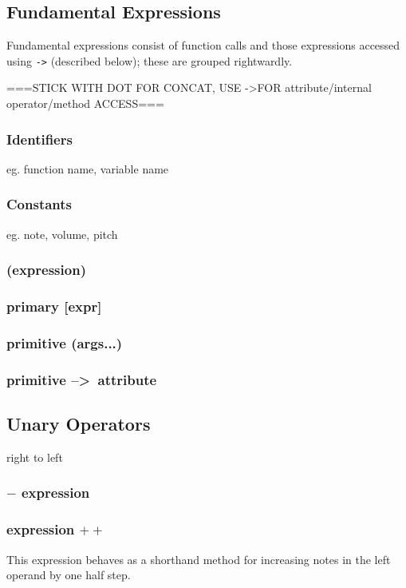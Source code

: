 \documentclass[letterpaper]{article}
\begin{document}
\subsection{Fundamental Expressions}
Fundamental expressions consist of function calls and those expressions accessed using \texttt{-\textgreater} (described below); these are grouped rightwardly.


===STICK WITH DOT FOR CONCAT, USE -\textgreater FOR attribute/internal operator/method ACCESS===

\subsubsection{Identifiers} 
eg. function name, variable name

\subsubsection{Constants}
eg. note, volume, pitch

\subsubsection{(expression)}
\subsubsection{primary [expr]}
\subsubsection{primitive (args...)}
\subsubsection{primitive --\textgreater\ attribute}

\subsection{Unary Operators}
right to left
\subsubsection{$-$ expression}
\subsubsection{expression $++$}
This expression behaves as a shorthand method for increasing notes in the left operand by one half step. 
\end{document}
